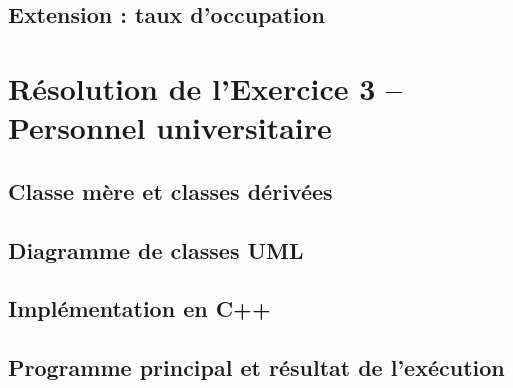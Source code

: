 \documentclass[12pt,a4paper]{article}
\begin{document}
\subsection{Extension : taux d'occupation}

\newpage
\section{Résolution de l'Exercice 3 -- Personnel universitaire}

\subsection{Classe mère et classes dérivées}

\subsection{Diagramme de classes UML}

\subsection{Implémentation en C++}

\subsection{Programme principal et résultat de l'exécution}
\end{document}

